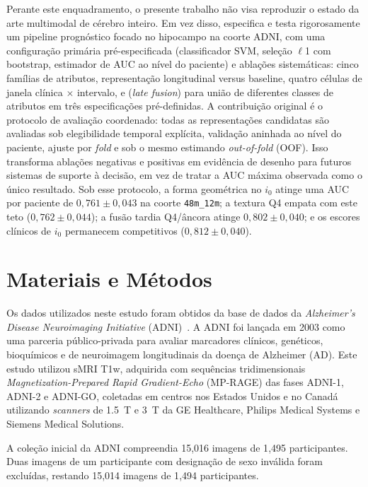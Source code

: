\documentclass[review]{elsarticle}
\newcommand{\code}[1]{\texttt{#1}}
\begin{document}
	Perante este enquadramento, o presente trabalho não visa reproduzir o estado da arte multimodal de cérebro inteiro. Em vez disso, especifica e testa rigorosamente um pipeline prognóstico focado no hipocampo na coorte ADNI, com uma configuração primária pré-especificada (classificador SVM, seleção $\ell$1 com bootstrap, estimador de AUC ao nível do paciente) e ablações sistemáticas: cinco famílias de atributos, representação longitudinal versus baseline, quatro células de janela clínica $\times$ intervalo, e (\emph{late fusion}) para união de diferentes classes de atributos em três especificações pré-definidas. A contribuição original é o protocolo de avaliação coordenado: todas as representações candidatas são avaliadas sob elegibilidade temporal explícita, validação aninhada ao nível do paciente, ajuste por \textit{fold} e sob o mesmo estimando \emph{out-of-fold} (OOF). Isso transforma ablações negativas e positivas em evidência de desenho para futuros sistemas de suporte à decisão, em vez de tratar a AUC máxima observada como o único resultado. Sob esse protocolo, a forma geométrica no $i_0$ atinge uma AUC por paciente de $0,761 \pm 0,043$ na coorte \code{48m\_12m}; a textura Q4 empata com este teto ($0,762 \pm 0,044$); a fusão tardia Q4/âncora atinge $0,802 \pm 0,040$; e os escores clínicos de $i_0$ permanecem competitivos ($0,812 \pm 0,040$). 
	
	\section{Materiais e Métodos}\label{sec:Material-and-Methods}
	
	Os dados utilizados neste estudo foram obtidos da base de dados da \emph{Alzheimer's Disease Neuroimaging Initiative} (ADNI)~\cite{petersen-2009,jr-2008}. A ADNI foi lançada em 2003 como uma parceria público-privada para avaliar marcadores clínicos, genéticos, bioquímicos e de neuroimagem longitudinais da doença de Alzheimer (AD). Este estudo utilizou sMRI T1w, adquirida com sequências tridimensionais \emph{Magnetization-Prepared Rapid Gradient-Echo} (MP-RAGE) das fases ADNI-1, ADNI-2 e ADNI-GO, coletadas em centros nos Estados Unidos e no Canadá utilizando \textit{scanners} de 1.5~T e 3~T da GE Healthcare, Philips Medical Systems e Siemens Medical Solutions.
	
	A coleção inicial da ADNI compreendia 15{,}016 imagens de 1{,}495 participantes. Duas imagens de um participante com designação de sexo inválida foram excluídas, restando 15{,}014 imagens de 1{,}494 participantes.
	
\end{document}
